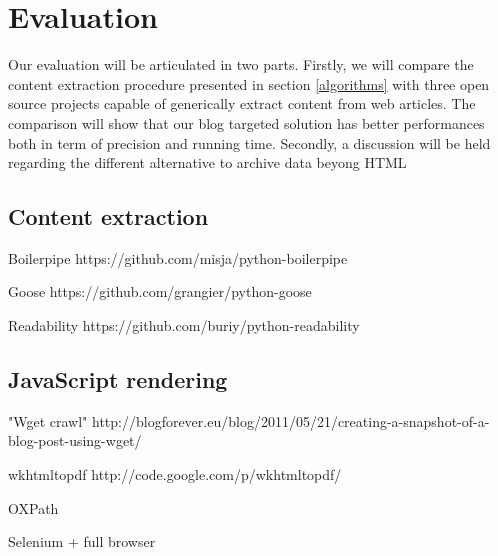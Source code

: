 \section{Evaluation}

Our evaluation will be articulated in two parts. Firstly, we will compare the content extraction procedure presented in section \ref{algorithms} with three open source projects capable of generically extract content from web articles. The comparison will show that our blog targeted solution has better performances both in term of precision and running time. Secondly, a discussion will be held regarding the different alternative to archive data beyong HTML



\subsection{Content extraction}


\item Boilerpipe https://github.com/misja/python-boilerpipe
\item Goose https://github.com/grangier/python-goose
\item Readability https://github.com/buriy/python-readability




\subsection{JavaScript rendering}


\item "Wget crawl" http://blogforever.eu/blog/2011/05/21/creating-a-snapshot-of-a-blog-post-using-wget/
\item wkhtmltopdf http://code.google.com/p/wkhtmltopdf/
\item OXPath
\item Selenium + full browser




